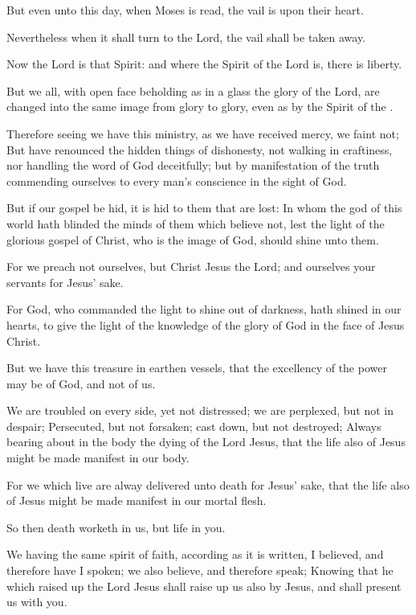 \Verse But even unto this day, when Moses is read, the vail is upon their heart.

\Verse Nevertheless when it shall turn to the Lord, the vail shall be taken away.

\Verse Now the Lord is that Spirit: and where the Spirit of the Lord is, there is liberty.

\Verse But we all, with open face beholding as in a glass the glory of the Lord, are changed into the same image from glory to glory, even as by the Spirit of the \LORD.


\Chapter
\Verse Therefore seeing we have this ministry, as we have received mercy, we faint not; \Verse But have renounced the hidden things of dishonesty, not walking in craftiness, nor handling the word of God deceitfully; but by manifestation of the truth commending ourselves to every man's conscience in the sight of God.

\Verse But if our gospel be hid, it is hid to them that are lost: \Verse In whom the god of this world hath blinded the minds of them which believe not, lest the light of the glorious gospel of Christ, who is the image of God, should shine unto them.

\Verse For we preach not ourselves, but Christ Jesus the Lord; and ourselves your servants for Jesus' sake.

\Verse For God, who commanded the light to shine out of darkness, hath shined in our hearts, to give the light of the knowledge of the glory of God in the face of Jesus Christ.

\Verse But we have this treasure in earthen vessels, that the excellency of the power may be of God, and not of us.

\Verse We are troubled on every side, yet not distressed; we are perplexed, but not in despair; \Verse Persecuted, but not forsaken; cast down, but not destroyed; \Verse Always bearing about in the body the dying of the Lord Jesus, that the life also of Jesus might be made manifest in our body.

\Verse For we which live are alway delivered unto death for Jesus' sake, that the life also of Jesus might be made manifest in our mortal flesh.

\Verse So then death worketh in us, but life in you.

\Verse We having the same spirit of faith, according as it is written, I believed, and therefore have I spoken; we also believe, and therefore speak; \Verse Knowing that he which raised up the Lord Jesus shall raise up us also by Jesus, and shall present us with you.

